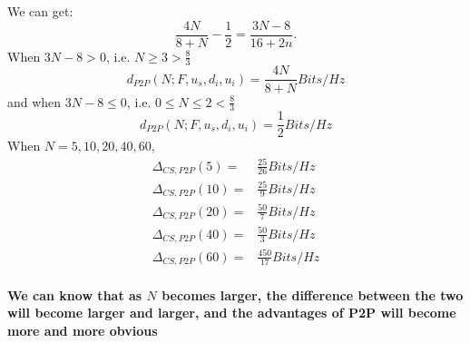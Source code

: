 \documentclass{article}
\begin{document}
            We can get:
            $$\frac{4N}{8+N}-\frac{1}{2}=\frac{3N-8}{16+2n}.$$
            When $3N-8>0$, i.e. $N\geq 3>\frac{8}{3}$
                $$d_{P2P}(N;F,u_s,d_i,u_i)=\frac{4N}{8+N}Bits/Hz$$
            and when $3N-8\leq 0$, i.e. $0\leq N\leq 2 <\frac{8}{3}$
                $$d_{P2P}(N;F,u_s,d_i,u_i)=\frac{1}{2}Bits/Hz$$
            When $N=5,10,20,40,60$,
                \begin{equation*}
                    \begin{split}
                        \Delta_{CS,P2P}(5)=&\frac{25}{26}Bits/Hz\\
                        \Delta_{CS,P2P}(10)=&\frac{25}{9}Bits/Hz\\
                        \Delta_{CS,P2P}(20)=&\frac{50}{7}Bits/Hz\\
                        \Delta_{CS,P2P}(40)=&\frac{50}{3}Bits/Hz\\
                        \Delta_{CS,P2P}(60)=&\frac{450}{17}Bits/Hz
                    \end{split}
                \end{equation*}
                \paragraph{
                    We can know that as $N$ becomes larger, the difference between the two will become larger and larger, and the advantages of P2P will become more and more obvious 
                }

        \subsection{}
\end{document}
